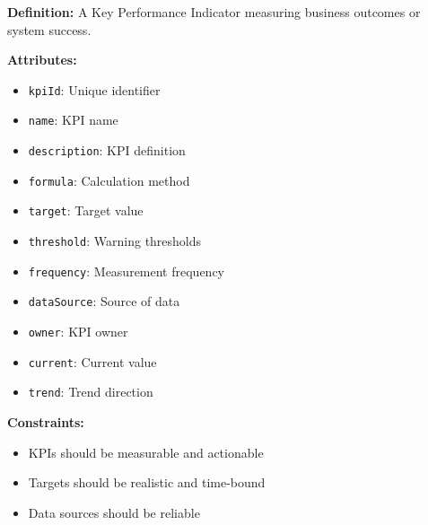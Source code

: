 \documentclass[11pt,letterpaper]{article}
\begin{document}
\begin{definitionbox}
\textbf{Definition:} A Key Performance Indicator measuring business outcomes or system success.

\textbf{Attributes:}
\begin{itemize}[nosep]
    \item \texttt{kpiId}: Unique identifier
    \item \texttt{name}: KPI name
    \item \texttt{description}: KPI definition
    \item \texttt{formula}: Calculation method
    \item \texttt{target}: Target value
    \item \texttt{threshold}: Warning thresholds
    \item \texttt{frequency}: Measurement frequency
    \item \texttt{dataSource}: Source of data
    \item \texttt{owner}: KPI owner
    \item \texttt{current}: Current value
    \item \texttt{trend}: Trend direction
\end{itemize}

\textbf{Constraints:}
\begin{itemize}[nosep]
    \item KPIs should be measurable and actionable
    \item Targets should be realistic and time-bound
    \item Data sources should be reliable
\end{itemize}
\end{definitionbox}
\end{document}
